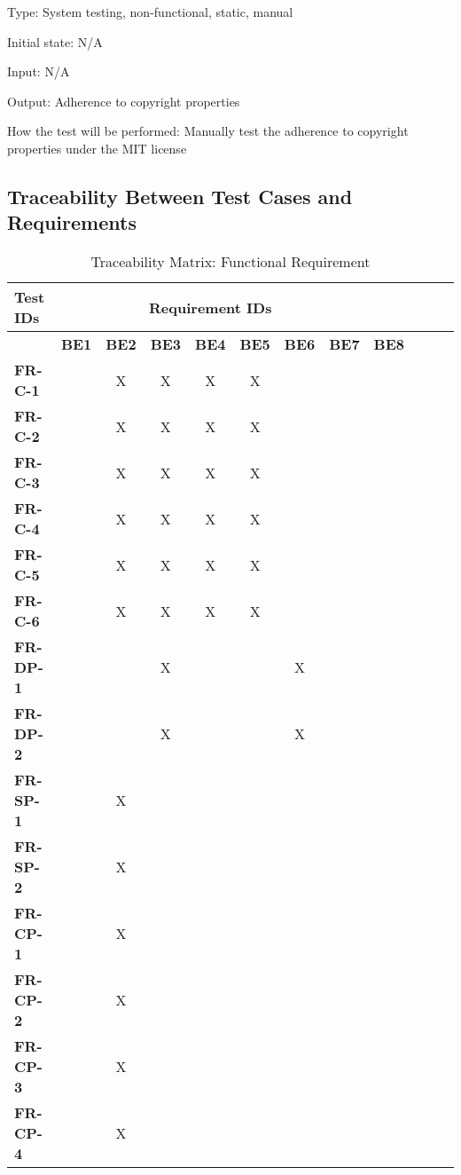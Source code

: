 \documentclass[12pt, titlepage]{article}
\begin{document}
Type: System testing, non-functional, static, manual

Initial state: N/A

Input: N/A

Output: Adherence to copyright properties

How the test will be performed: Manually test the adherence to copyright properties under the MIT license

\subsection{Traceability Between Test Cases and Requirements}
\begin{table}[H]
    \centering
    \caption{Traceability Matrix: Functional Requirement}
    \begin{adjustbox}{max width=0.7\paperwidth}
    \begin{tabular}{l|ccccccccccc}
        \textbf{Test IDs} & \multicolumn{7}{c}{\textbf{Requirement IDs}}\\
        \hline
        ~ & \textbf{BE1} & \textbf{BE2} & \textbf{BE3} & \textbf{BE4} & \textbf{BE5} & \textbf{BE6} & \textbf{BE7} & \textbf{BE8}\\
        \textbf{FR-C-1}    & ~ & X & X & X & X & ~ & ~ & ~\\
        \textbf{FR-C-2}    & ~ & X & X & X & X & ~ & ~ & ~\\
        \textbf{FR-C-3}    & ~ & X & X & X & X & ~ & ~ & ~\\
        \textbf{FR-C-4}    & ~ & X & X & X & X & ~ & ~ & ~\\
        \textbf{FR-C-5}    & ~ & X & X & X & X & ~ & ~ & ~\\
        \textbf{FR-C-6}    & ~ & X & X & X & X & ~ & ~ & ~\\
        \textbf{FR-DP-1}   & ~ & ~ & X & ~ & ~ & X & ~ & ~\\
        \textbf{FR-DP-2}   & ~ & ~ & X & ~ & ~ & X & ~ & ~\\
        \textbf{FR-SP-1}   & ~ & X & ~ & ~ & ~ & ~ & ~ & ~\\
        \textbf{FR-SP-2}   & ~ & X & ~ & ~ & ~ & ~ & ~ & ~\\
        \textbf{FR-CP-1}   & ~ & X & ~ & ~ & ~ & ~ & ~ & ~\\
        \textbf{FR-CP-2}   & ~ & X & ~ & ~ & ~ & ~ & ~ & ~\\
        \textbf{FR-CP-3}   & ~ & X & ~ & ~ & ~ & ~ & ~ & ~\\
        \textbf{FR-CP-4}   & ~ & X & ~ & ~ & ~ & ~ & ~ & ~\\

\end{tabular}
\end{adjustbox}
\end{table}
\end{document}
